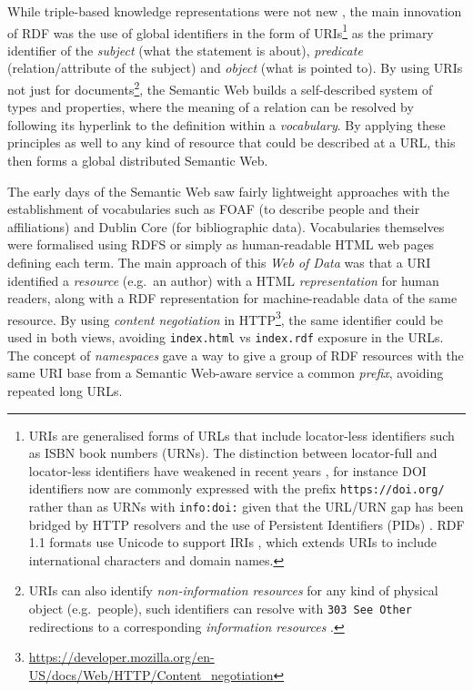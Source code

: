 \documentclass[fleqn,10pt,NOlineno]{wlpeerjlua}
\begin{document}
While triple-based knowledge representations were not new \autocite{stanczykProcessModellingInformation1987}, the main innovation of RDF was the use of global identifiers in the form of URIs\footnote{URIs \autocite{rfc3986} are generalised forms of URLs that include locator-less identifiers such as ISBN book numbers (URNs). The distinction between locator-full and locator-less identifiers have weakened in recent years \autocite{InfoURIRegistry}, for instance DOI identifiers now are commonly expressed with the prefix \texttt{https://doi.org/} rather than as URNs with \texttt{info:doi:} given that the URL/URN gap has been bridged by HTTP resolvers and the use of Persistent Identifiers (PIDs) \autocite{jutyIdentifiersOrgMIRIAM2011}. RDF 1.1 formats use Unicode to support IRIs \autocite{rfc3987}, which extends URIs to include international characters and domain names.} as the primary identifier of the \emph{subject} (what the statement is about), \emph{predicate} (relation/attribute of the subject) and \emph{object} (what is pointed to). By using URIs not just for documents\footnote{URIs can also identify \emph{non-information resources} for any kind of physical object (e.g.~people), such identifiers can resolve with \texttt{303\ See\ Other} redirections to a corresponding \emph{information resources} \autocite{sauermannCoolURIsSemantic2011}.}, the Semantic Web builds a self-described system of types and properties, where the meaning of a relation can be resolved by following its hyperlink to the definition within a \emph{vocabulary}. By applying these principles as well to any kind of resource that could be described at a URL, this then forms a global distributed Semantic Web.

The early days of the Semantic Web saw fairly lightweight approaches with the establishment of vocabularies such as FOAF (to describe people and their affiliations) and Dublin Core (for bibliographic data). Vocabularies themselves were formalised using RDFS or simply as human-readable HTML web pages defining each term. The main approach of this \emph{Web of Data} was that a URI identified a \emph{resource} (e.g.~an author) with a HTML \emph{representation} for human readers, along with a RDF representation for machine-readable data of the same resource. By using \emph{content negotiation} in HTTP\footnote{\url{https://developer.mozilla.org/en-US/docs/Web/HTTP/Content_negotiation}}, the same identifier could be used in both views, avoiding \texttt{index.html} vs \texttt{index.rdf} exposure in the URLs. The concept of \emph{namespaces} gave a way to give a group of RDF resources with the same URI base from a Semantic Web-aware service a common \emph{prefix}, avoiding repeated long URLs.
\end{document}
